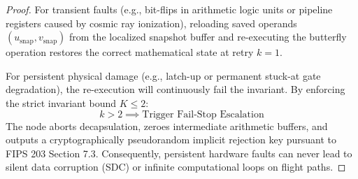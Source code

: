 \begin{proof}
For transient faults (e.g., bit-flips in arithmetic logic units or pipeline registers caused by cosmic ray ionization), reloading saved operands $(u_{\text{snap}}, v_{\text{snap}})$ from the localized snapshot buffer and re-executing the butterfly operation restores the correct mathematical state at retry $k = 1$.

For persistent physical damage (e.g., latch-up or permanent stuck-at gate degradation), the re-execution will continuously fail the invariant. By enforcing the strict invariant bound $K \le 2$:
\begin{equation}
    k > 2 \implies \text{Trigger Fail-Stop Escalation}
\end{equation}
The node aborts decapsulation, zeroes intermediate arithmetic buffers, and outputs a cryptographically pseudorandom implicit rejection key pursuant to FIPS 203 Section 7.3. Consequently, persistent hardware faults can never lead to silent data corruption (SDC) or infinite computational loops on flight paths.
\end{proof}
